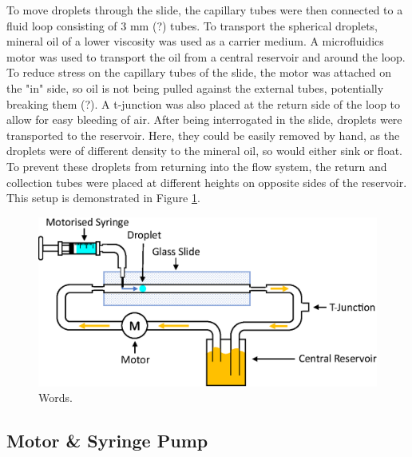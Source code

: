 \documentclass{physics_article_B}
\begin{document}
        To move droplets through the slide, the capillary tubes were then connected to a fluid loop consisting of 3 mm (?) tubes. To transport the spherical droplets, mineral oil of a lower viscosity was used as a carrier medium. A microfluidics motor was used to transport the oil from a central reservoir and around the loop. To reduce stress on the capillary tubes of the slide, the motor was attached on the "in" side, so oil is not being pulled against the external tubes, potentially breaking them (?). A t-junction was also placed at the return side of the loop to allow for easy bleeding of air. After being interrogated in the slide, droplets were transported to the reservoir. Here, they could be easily removed by hand, as the droplets were of different density to the mineral oil, so would either sink or float. To prevent these droplets from returning into the flow system, the return and collection tubes were placed at different heights on opposite sides of the reservoir. This setup is demonstrated in Figure \ref{fig:basic}.
        
            \begin{figure}[H]
            \centering
            \hspace*{2.0cm}\includegraphics[scale=0.8]{Figures/Fluid.eps}
            \captionsetup{justification=centering}
            \caption{Words.} 	
            \label{fig:basic}
            \end{figure} 

    \subsection{Motor \& Syringe Pump}
\end{document}
